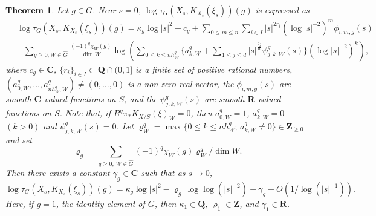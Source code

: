 \documentclass[amscd, leqno]{amsart}
\theoremstyle{plain}
\newtheorem{theorem}{Theorem}[section]
\theoremstyle{definition}
\theoremstyle{remark}
\begin{document}
\begin{theorem}
\label{Mthm:asym:exp}
Let $g \in G$. Near $s=0$, $\log \tau_{G}(X_{s},K_{X_{s}}(\xi_{s}))(g)$ is expressed as
$$
\begin{aligned}
\,&
\log \tau_{G}(X_{s},K_{X_{s}}(\xi_{s}))(g) 
= 
\kappa_{g} \log |s|^{2} + c_{g} + \sum_{0 \leq m \leq n} \sum_{i\in I} |s|^{2r_{i}} (\log |s|^{-2})^{m} \phi_{i,m,g}(s)
\\
&- \sum_{q \geq 0, W \in \widehat{G}} \frac{(-1)^{q}\chi_{W}(g)}{\dim W}
\log \left( \sum_{0 \leq k \leq nh^{q}_{W}} \{ a_{k,W}^{q} + \sum_{1 \leq j \leq d} |s|^{\frac{2j}{d}} \psi_{j,k,W}^{q}(s) \} (\log |s|^{-2})^{k} \right),
\end{aligned}
$$
where $c_{g} \in {\mathbf C}$, $\{ r_{i} \}_{i \in I} \subset {\mathbf Q}\cap (0,1]$ is a finite set of positive rational numbers,
$(a_{0,W}^{q}, \ldots, a_{nh^{q}_{W},W}^{q}) \not= (0,\ldots,0)$ is a non-zero real vector,
the $\phi_{i,m,g}(s)$ are smooth ${\mathbf C}$-valued functions on $S$, and the $\psi_{j,k,W}^{q}(s)$ are smooth ${\mathbf R}$-valued 
functions on $S$. 
Note that, if $R^{q}\pi_{*}K_{X/S}(\xi)_{W}=0$, then $a_{0,W}^{q}=1$, $a_{k,W}^{q}=0$ $(k>0)$ and $\psi_{j,k,W}^{q}(s)=0$.
Let $\varrho^{q}_{W} = \max\{ 0 \leq k \leq nh^{q}_{W};\, a_{k,W}^{q} \not=0 \} \in {\mathbf Z}_{\geq0}$ and set
$$
\varrho_{g} = \sum_{q\geq0, \,W\in \widehat{G}} (-1)^{q} \chi_{W}(g) \varrho^{q}_{W} / \dim W.
$$
Then there exists a constant $\gamma_{g} \in {\mathbf C}$ such that as $s\to0$,
$$
\log \tau_{G}(X_{s},K_{X_{s}}(\xi_{s}))(g) = \kappa_{g} \log |s|^{2} - \varrho_{g}\,\log\log( |s|^{-2}) + \gamma_{g} + O\left(1/\log (|s|^{-1}) \right).
$$
Here, if $g=1$, the identity element of $G$, 
then $\kappa_{1} \in {\mathbf Q}$, $\varrho_{1} \in {\mathbf Z}$, and $\gamma_{1} \in {\mathbf R}$. 
\end{theorem}
\end{document}
